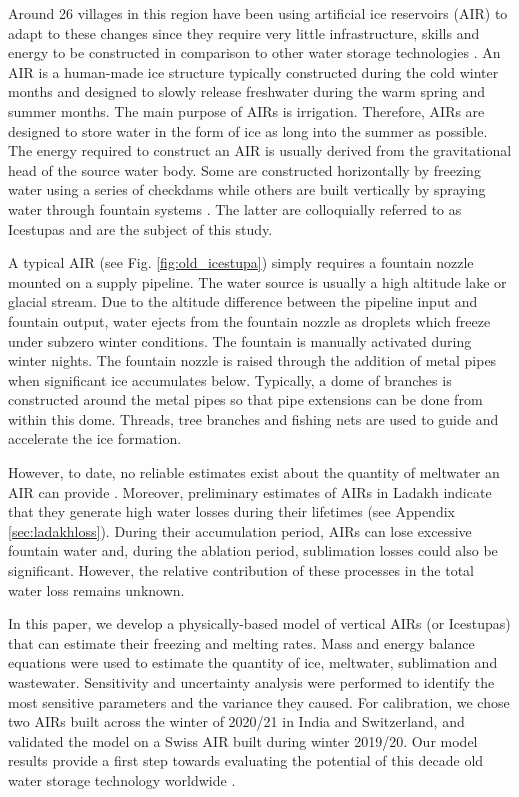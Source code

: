 \documentclass[utf8]{frontiersSCNS}
\begin{document}
Around 26 villages in this region \citep{isc} have been using artificial ice reservoirs (AIR) to adapt to these changes since
they require very little infrastructure, skills and energy to be constructed in comparison to other water
storage technologies \citep{IPCC_2019,10.1659/MRD-JOURNAL-D-18-00072.1}. An AIR is a human-made ice
structure typically constructed during the cold winter months and designed to slowly release freshwater during
the warm spring and summer months.  The main purpose of AIRs is irrigation. Therefore, AIRs are designed to
store water in the form of ice as long into the summer as possible. The energy required to construct an AIR is
usually derived from the gravitational head of the source water body. Some are constructed horizontally by
freezing water using a series of checkdams while others are built vertically by spraying water through fountain
systems \citep{Nusser_2018}. The latter are colloquially referred to as Icestupas and are the subject of this
study.

A typical AIR (see Fig. \ref{fig:old_icestupa}) simply requires a fountain nozzle mounted on a supply pipeline.
The water source is usually a high altitude lake or glacial stream. Due to the altitude difference between the
pipeline input and fountain output, water ejects from the fountain nozzle as droplets which freeze under subzero
winter conditions. The fountain is manually activated during winter nights. The fountain nozzle is raised
through the addition of metal pipes when significant ice accumulates below.  Typically, a dome of branches is
constructed around the metal pipes so that pipe extensions can be done from within this dome. Threads, tree
branches and fishing nets are used to guide and accelerate the ice formation.

However, to date, no reliable estimates exist about the quantity of meltwater an AIR can provide
\citep{Nusser_2018}. Moreover, preliminary estimates of AIRs in Ladakh indicate that they generate high water
losses during their lifetimes (see Appendix \ref{sec:ladakhloss}). During their accumulation period, AIRs can
lose excessive fountain water and, during the ablation period, sublimation losses could also be significant.
However, the relative contribution of these processes in the total water loss remains unknown.

In this paper, we develop a physically-based model of vertical AIRs (or Icestupas) that can estimate their
freezing and melting rates. Mass and energy balance equations were used to estimate the quantity of ice,
meltwater, sublimation and wastewater. Sensitivity and uncertainty analysis were performed to identify the most
sensitive parameters and the variance they caused. For calibration, we chose two AIRs built across the winter of
2020/21 in India and Switzerland, and validated the model on a Swiss AIR built during winter 2019/20. Our model
results provide a first step towards evaluating the potential of this decade old water storage technology
worldwide \citep{campaign}.
\end{document}
